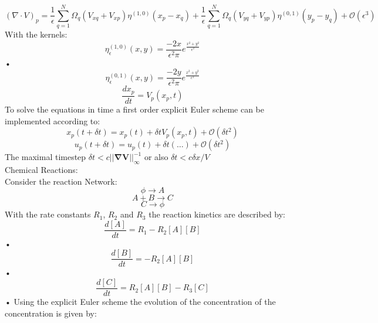 \documentclass[hyperref]{labbook}
\numberwithin{equation}{experiment}
\numberwithin{table}{experiment}
\numberwithin{figure}{experiment}
\begin{document}
\begin{equation}
(\nabla \cdot V)_p  = \frac{1}{\epsilon} \sum_{q = 1 }^N \Omega_q (V_{xq} + V_{xp}) \eta^{(1,0)}(x_p - x_q) + \frac{1}{\epsilon} \sum_{q = 1 }^N \Omega_q (V_{yq} + V_{yp}) \eta^{(0,1)}(y_p - y_q) + \mathcal{O}(\epsilon^3)
\end{equation}
With the kernels: 
\begin{equation}
\eta_\epsilon^{(1,0)}(x,y) = \frac{-2x}{\epsilon^2 \pi }e^{\frac{x^2+y^2}{\epsilon^2}}
\end{equation}•
\begin{equation}
\eta_\epsilon^{(0,1)}(x,y) = \frac{-2y}{\epsilon^2 \pi }e^{\frac{x^2+y^2}{\epsilon^2}}
\end{equation}
\begin{equation}
\frac{dx_p}{dt} = V_p(x_p,t)
\end{equation}
To solve the equations in time a first order explicit Euler scheme can be implemented according to: 
\begin{equation}
x_p(t + \delta t ) = x_p(t) + \delta t V_p(x_p,t) + \mathcal{O}(\delta t^2)
\end{equation}
\begin{equation}
u_p(t + \delta t ) = u_p(t) + \delta t ( \dots) + \mathcal{O}(\delta t^2)
\end{equation}
The maximal timestep $\delta t < c||\boldsymbol\nabla\boldsymbol V||_\infty^{-1} $ or also $\delta t < c \delta x /V$\\[1em]
Chemical Reactions: \\
Consider the reaction Network: \\
\begin{equation}
\phi \rightarrow A 
\end{equation}
\begin{equation}
A+B \rightarrow C 
\end{equation}
\begin{equation}
C \rightarrow \phi 
\end{equation}
With the rate constants $R_1$, $R_2$ and $R_3$ the reaction kinetics are described by: 
\begin{equation}
\frac{d[A]}{dt} = R_1 - R_2 [A][B]
\end{equation}•
\begin{equation}
\frac{d[B]}{dt} = - R_2 [A][B]
\end{equation}•
\begin{equation}
\frac{d[C]}{dt} = R_2 [A][B] - R_3 [C]
\end{equation}•
Using the explicit Euler scheme the evolution of the concentration of the concentration is given by:
\end{document}
